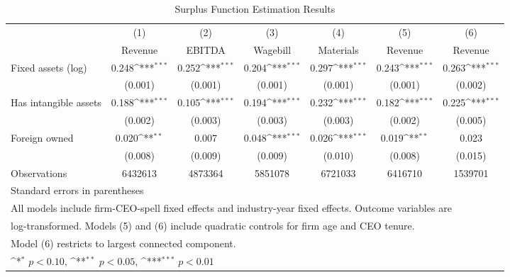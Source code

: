 \begin{table}[htbp]\centering
\def\sym#1{\ifmmode^{#1}\else\(^{#1}\)\fi}
\caption{Surplus Function Estimation Results}
\begin{tabular}{l*{6}{c}}
\toprule
                    &\multicolumn{1}{c}{(1)}&\multicolumn{1}{c}{(2)}&\multicolumn{1}{c}{(3)}&\multicolumn{1}{c}{(4)}&\multicolumn{1}{c}{(5)}&\multicolumn{1}{c}{(6)}\\
                    &\multicolumn{1}{c}{Revenue}&\multicolumn{1}{c}{EBITDA}&\multicolumn{1}{c}{Wagebill}&\multicolumn{1}{c}{Materials}&\multicolumn{1}{c}{Revenue}&\multicolumn{1}{c}{Revenue}\\
\midrule
Fixed assets (log)  &       0.248\sym{***}&       0.252\sym{***}&       0.204\sym{***}&       0.297\sym{***}&       0.243\sym{***}&       0.263\sym{***}\\
                    &     (0.001)         &     (0.001)         &     (0.001)         &     (0.001)         &     (0.001)         &     (0.002)         \\
\addlinespace
Has intangible assets&       0.188\sym{***}&       0.105\sym{***}&       0.194\sym{***}&       0.232\sym{***}&       0.182\sym{***}&       0.225\sym{***}\\
                    &     (0.002)         &     (0.003)         &     (0.003)         &     (0.003)         &     (0.002)         &     (0.005)         \\
\addlinespace
Foreign owned       &       0.020\sym{**} &       0.007         &       0.048\sym{***}&       0.026\sym{***}&       0.019\sym{**} &       0.023         \\
                    &     (0.008)         &     (0.009)         &     (0.009)         &     (0.010)         &     (0.008)         &     (0.015)         \\
\midrule
Observations        &     6432613         &     4873364         &     5851078         &     6721033         &     6416710         &     1539701         \\
\bottomrule
\multicolumn{7}{l}{\footnotesize Standard errors in parentheses}\\
\multicolumn{7}{l}{\footnotesize All models include firm-CEO-spell fixed effects and industry-year fixed effects. Outcome variables are}\\
\multicolumn{7}{l}{\footnotesize log-transformed. Models (5) and (6) include quadratic controls for firm age and CEO tenure.}\\
\multicolumn{7}{l}{\footnotesize Model (6) restricts to largest connected component.}\\
\multicolumn{7}{l}{\footnotesize \sym{*} \(p<0.10\), \sym{**} \(p<0.05\), \sym{***} \(p<0.01\)}\\
\end{tabular}
\end{table}
